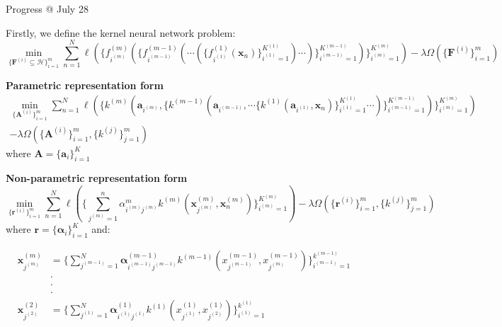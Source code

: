 \documentclass{article}
\begin{document}
\newpage
\LARGE Progress @ July 28\normalsize\vspace{3ex}

\par Firstly, we define the kernel neural network problem:
\color[rgb]{1,0,0}
\begin{equation}
  \min_{\{\mathbf{F}^{(i)} \subseteq{\mathcal{H}}\}_{i=1}^{m}} \sum_{n=1}^{N} \ell ( \{ f_{i^{(m)}}^{(m)} ( \{ f_{i^{(m-1)}}^{(m-1)} ( \cdots ( \{ f_{i^{(1)}}^{(1)}(\mathbf{x}_n) \}_{i^{(1)}=1}^{K^{(1)}} ) \cdots ) \}_{i^{(m-1)}=1}^{K^{(m-1)}} )\}_{i^{(m)}=1}^{K^{(m)}} )
  - \lambda\Omega(\{\mathbf{F}^{(i)} \}_{i=1}^{m})
\end{equation}
\color[rgb]{0,0,0}

\par \textbf{Parametric representation form}
\begin{equation}
\begin{split}
  \min_{\{\mathbf{A}^{(i)}\}_{i=1}^{m}} \sum_{n=1}^{N} \ell ( \{ k^{(m)} (\mathbf{a}_{i^{(m)}}, \{ k^{(m-1)} (\mathbf{a}_{i^{(m-1)}}, \cdots \{ k^{(1)}(\mathbf{a}_{i^{(1)}}, \mathbf{x}_n) \}_{i^{(1)}=1}^{K^{(1)}} \cdots ) \}_{i^{(m-1)}=1}^{K^{(m-1)}} )\}_{i^{(m)}=1}^{K^{(m)}} )\\
  - \lambda\Omega(\{\mathbf{A}^{(i)} \}_{i=1}^{m}, \{k^{(j)} \}_{j=1}^{m})
\end{split}
\end{equation}
where $\mathbf{A}=\{\mathbf{a}_i\}_{i=1}^{K}$\\

\par \textbf{Non-parametric representation form}
\begin{equation}
  \min_{\{\mathbf{r}^{(i)}\}_{i=1}^{m}} \sum_{n=1}^{N} \ell ( \{ \sum_{j^{(m)}=1}^{n} \alpha^{m}_{i^{(m)}j^{(m)}} k^{(m)} (\mathbf{x}_{j^{(m)}}^{(m)}, \mathbf{x}_{n}^{(m)})\}_{i^{(m)}=1}^{K^{(m)}} )
  - \lambda\Omega(\{\mathbf{r}^{(i)} \}_{i=1}^{m}, \{k^{(j)} \}_{j=1}^{m})
\end{equation}
where $\mathbf{r}=\{\bm{\alpha}_i\}_{i=1}^{K}$ and:

\begin{equation}
\begin{split}
\mathbf{x}_{j^{(m)}}^{(m)} &= \{  \sum_{j^{(m-1)}=1}^{N} \bm{\alpha}_{i^{(m-1)} j^{(m-1)}}^{(m-1)} k^{(m-1)} (x_{j^{(m-1)}}^{(m-1)}, x_{j^{(m)}}^{(m-1)}) \}_{i^{(m-1)}=1}^{k^{(m-1)}}\\
&\cdot\\
&\cdot\\
&\cdot\\
\mathbf{x}_{j^{(2)}}^{(2)} &= \{  \sum_{j^{(1)}=1}^{N} \bm{\alpha}_{i^{(1)} j^{(1)}}^{(1)} k^{(1)} (x_{j^{(1)}}^{(1)}, x_{j^{(2)}}^{(1)}) \}_{i^{(1)}=1}^{k^{(1)}}
\end{split}
\end{equation}



\newpage


\end{document}
